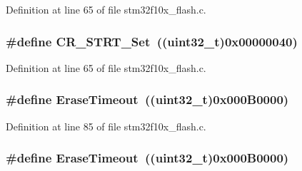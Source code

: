 Definition at line 65 of file stm32f10x\+\_\+flash.\+c.

\subsubsection[{\texorpdfstring{C\+R\+\_\+\+S\+T\+R\+T\+\_\+\+Set}{CR_STRT_Set}}]{\setlength{\rightskip}{0pt plus 5cm}\#define C\+R\+\_\+\+S\+T\+R\+T\+\_\+\+Set~(({\bf uint32\+\_\+t})0x00000040)}\hypertarget{group___f_l_a_s_h___private___defines_ga0e6349818d8602ffffc56e5e04d9ab13}{}\label{group___f_l_a_s_h___private___defines_ga0e6349818d8602ffffc56e5e04d9ab13}


Definition at line 65 of file stm32f10x\+\_\+flash.\+c.

\subsubsection[{\texorpdfstring{Erase\+Timeout}{EraseTimeout}}]{\setlength{\rightskip}{0pt plus 5cm}\#define Erase\+Timeout~(({\bf uint32\+\_\+t})0x000\+B0000)}\hypertarget{group___f_l_a_s_h___private___defines_ga62b5515e9a29a487adcc30a88d082244}{}\label{group___f_l_a_s_h___private___defines_ga62b5515e9a29a487adcc30a88d082244}


Definition at line 85 of file stm32f10x\+\_\+flash.\+c.

\subsubsection[{\texorpdfstring{Erase\+Timeout}{EraseTimeout}}]{\setlength{\rightskip}{0pt plus 5cm}\#define Erase\+Timeout~(({\bf uint32\+\_\+t})0x000\+B0000)}\hypertarget{group___f_l_a_s_h___private___defines_ga62b5515e9a29a487adcc30a88d082244}{}\label{group___f_l_a_s_h___private___defines_ga62b5515e9a29a487adcc30a88d082244}


